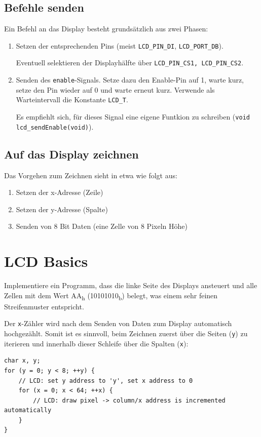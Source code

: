 \subsection*{Befehle senden}
Ein Befehl an das Display besteht grundsätzlich aus zwei Phasen:
\begin{enumerate}
\item
Setzen der entsprechenden Pins (meist \texttt{LCD\_PIN\_DI}, \texttt{LCD\_PORT\_DB}).

Eventuell selektieren der Displayhälfte über \texttt{LCD\_PIN\_CS1, LCD\_PIN\_CS2}.

\item
Senden des \texttt{enable}-Signals.
Setze dazu den Enable-Pin auf 1, warte kurz, setze den Pin wieder auf 0 und warte erneut kurz.
Verwende als Warteintervall die Konstante \texttt{LCD\_T}.

Es empfiehlt sich, für dieses Signal eine eigene Funtkion zu schreiben (\texttt{void lcd\_sendEnable(void)}).
\end{enumerate}

\subsection*{Auf das Display zeichnen}

Das Vorgehen zum Zeichnen sieht in etwa wie folgt aus:
\begin{enumerate}
	\item Setzen der x-Adresse (Zeile)
	\item Setzen der y-Adresse (Spalte)
	\item Senden von 8 Bit Daten (eine \glqq{}Zelle\grqq{} von 8 Pixeln Höhe)
\end{enumerate}



\section{LCD Basics}
Implementiere ein Programm, dass die linke Seite des Displays ansteuert und alle Zellen mit dem Wert AA\textsubscript{h} (10101010\textsubscript{b}) belegt, was einem sehr feinen Streifenmuster entspricht.

Der \texttt{x}-Zähler wird nach dem Senden von Daten zum Display automatisch hochgezählt.
Somit ist es sinnvoll, beim Zeichnen zuerst über die Seiten (\texttt{y}) zu iterieren und innerhalb dieser Schleife über die Spalten (\texttt{x}):
\begin{lstlisting}
char x, y;
for (y = 0; y < 8; ++y) {
	// LCD: set y address to 'y', set x address to 0
	for (x = 0; x < 64; ++x) {
	    // LCD: draw pixel -> column/x address is incremented automatically
	}
}
\end{lstlisting}

